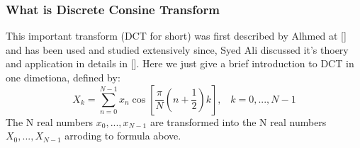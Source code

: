 \subsubsection{What is Discrete Consine Transform}
This important transform (DCT for short) was first described by Alhmed at [] and has been used and studied extensively since, Syed Ali discussed it's thoery and application in details in []. Here we just give a brief introduction to DCT in one dimetiona, defined by:
\[  X_{k} = \sum_{n=0}^{N-1}x_{n}\cos[\frac{\pi}{N}(n+\frac{1}{2})k],\;\;\;k = 0,...,N\!\!-\!\!1 \]
The N real numbers \begin{math}x_{0},...,x_{N-1}\end{math} are transformed into the N real numbers \begin{math}X_{0},...,X_{N-1}\end{math} arroding to formula above.
